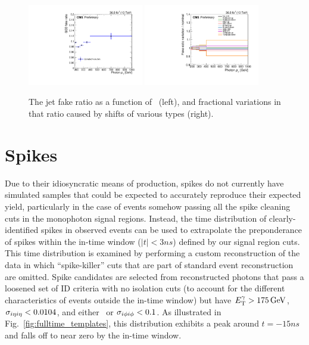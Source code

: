 \begin{figure}[hbtp]
  \begin{center}
  \includegraphics[width=0.45\textwidth]{Figures/QCD/QCDfake_fakeratio.pdf}
  \includegraphics[width=0.45\textwidth]{Figures/QCD/QCDfake_systematics.pdf}
  \caption{The jet fake ratio as a function of \ETgamma\ (left), and fractional variations in that ratio caused by shifts of various types (right).}
  \label{fig:qcd_fake_ratio}
  \end{center}
\end{figure}

\section{Spikes} \label{sec:background_estimation_spikes}
Due to their idiosyncratic means of production, spikes do not currently have simulated samples that could be expected to accurately reproduce their expected yield,
particularly in the case of events somehow passing all the spike cleaning cuts in the monophoton signal regions. Instead, the time distribution of clearly-identified
spikes in observed events can be used to extrapolate the preponderance of spikes within the in-time window ($|t|<3\unit{ns}$) defined by our signal region cuts.
This time distribution is examined by performing a custom reconstruction of the data in which ``spike-killer'' cuts that are part of standard event reconstruction
are omitted. Spike candidates are selected from reconstructed photons that pass a loosened set of ID criteria with no isolation cuts (to account for the different
characteristics of events outside the in-time window) but have $\ETgamma > 175\unit{GeV}$, $\sieie < 0.0104$, and either \sieie\ or $\sipip < 0.1$.
As illustrated in Fig.~\ref{fig:fulltime_templates}, this distribution exhibits a peak around $t = -15\unit{ns}$ and falls off to near zero by the in-time window.

